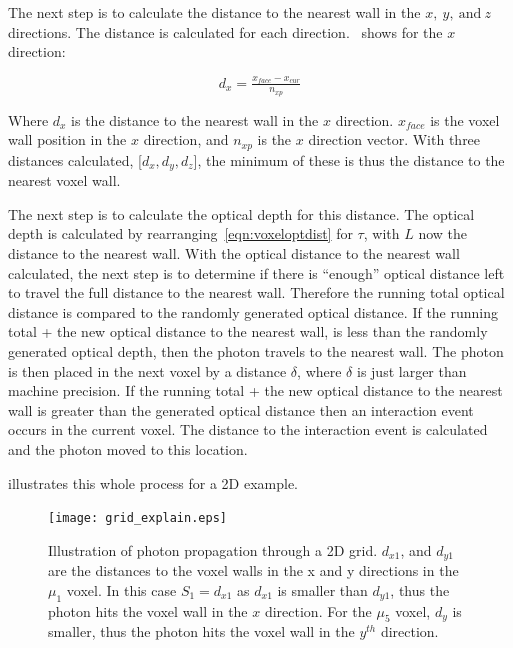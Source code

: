 The next step is to calculate the distance to the nearest wall in the $x,\ y,\ \text{and}\ z$ directions.
The distance is calculated for each direction.~ shows for the $x$ direction:

\begin{equation}
d_{x} = \tfrac{x_{face} - x_{cur}}{n_{xp}}
\label{eqn:walldist}
\end{equation}

Where $d_x$ is the distance to the nearest wall in the $x$ direction. $x_{face}$ is the voxel wall position in the $x$ direction, and $n_{xp}$ is the $x$ direction vector.
With three distances calculated, [$d_x, d_y, d_z$], the minimum of these is thus the distance to the nearest voxel wall.

The next step is to calculate the optical depth for this distance.
The optical depth is calculated by rearranging~\cref{eqn:voxeloptdist} for $\tau$, with $L$ now the distance to the nearest wall.
With the optical distance to the nearest wall calculated, the next step is to determine if there is ``enough'' optical distance left to travel the full distance to the nearest wall.
Therefore the running total optical distance is compared to the randomly generated optical distance.
If the running total + the new optical distance to the nearest wall, is less than the randomly generated optical depth, then the photon travels to the nearest wall.
The photon is then placed in the next voxel by a distance $\delta$, where $\delta$ is just larger than machine precision.
If the running total + the new optical distance to the nearest wall is greater than the generated optical distance then an interaction event occurs in the current voxel.
The distance to the interaction event is calculated and the photon moved to this location. 

 illustrates this whole process for a 2D example.

\begin{figure}[!ht]
	\centering
	\texttt{[image: grid\_explain.eps]}
	\caption{Illustration of photon propagation through a 2D grid. $d_{x1}$, and $d_{y1}$ are the distances to the voxel walls in the x and y directions in the $\mu_1$ voxel. In this case $S_1=d_{x1}$ as $d_{x1}$ is smaller than $d_{y1}$, thus the photon hits the voxel wall in the $x$ direction. For the $\mu_5$ voxel, $d_y$ is smaller, thus the photon hits the voxel wall in the $y^{th}$ direction.}
	\label{fig:voxelpropexplain}
\end{figure}

